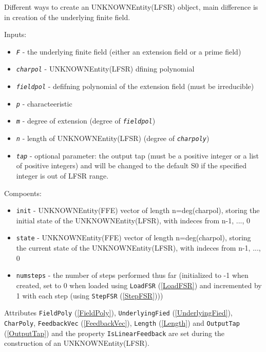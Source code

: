\documentclass[a4paper,11pt]{report}
\begin{document}
{{{ Different ways to create an UNKNOWNEntity(LFSR) oblject, main difference is in
creation of the underlying finite field. 

 Inputs: 
\begin{itemize}
\item  \mbox{\texttt{\mdseries\slshape F}} - the underlying finite field (either an extension field or a prime field)
\item  \mbox{\texttt{\mdseries\slshape charpol}} - UNKNOWNEntity(LFSR) dfining polynomial 
\item  \mbox{\texttt{\mdseries\slshape fieldpol}} - defifning polynomial of the extension field (must be irreducible)
\item  \mbox{\texttt{\mdseries\slshape p}} - characteeristic 
\item  \mbox{\texttt{\mdseries\slshape m}} - degree of extension (degree of \mbox{\texttt{\mdseries\slshape fieldpol}}) 
\item  \mbox{\texttt{\mdseries\slshape n}} - length of UNKNOWNEntity(LFSR) (degree of \mbox{\texttt{\mdseries\slshape charpoly}})
\item  \mbox{\texttt{\mdseries\slshape tap}} - optional parameter: the output tap (must be a positive integer or a list of
positive integers) and will be changed to the default S{\textunderscore}0 if
the specified integer is out of LFSR range.
\end{itemize}
 Compoents: 
\begin{itemize}
\item  \texttt{init} - UNKNOWNEntity(FFE) vector of length n=deg(charpol), storing the initial
state of the UNKNOWNEntity(LFSR), with indeces from n-1, ..., 0
\item  \texttt{state} - UNKNOWNEntity(FFE) vector of length n=deg(charpol), storing the current
state of the UNKNOWNEntity(LFSR), with indeces from n-1, ..., 0
\item  \texttt{numsteps} - the number of steps performed thus far (initialized to -1 when created, set
to 0 when loaded using \texttt{LoadFSR} (\ref{LoadFSR}) and incremented by 1 with each step (using \texttt{StepFSR} (\ref{StepFSR}))) 
\end{itemize}
 Attributes \texttt{FieldPoly} (\ref{FieldPoly}), \texttt{UnderlyingFied} (\ref{UnderlyingFied}), \texttt{CharPoly}, \texttt{FeedbackVec} (\ref{FeedbackVec}), \texttt{Length} (\ref{Length}) and \texttt{OutputTap} (\ref{OutputTap}) and the property \texttt{IsLinearFeedback} are set during the construction of an UNKNOWNEntity(LFSR). 

}}}
\end{document}
